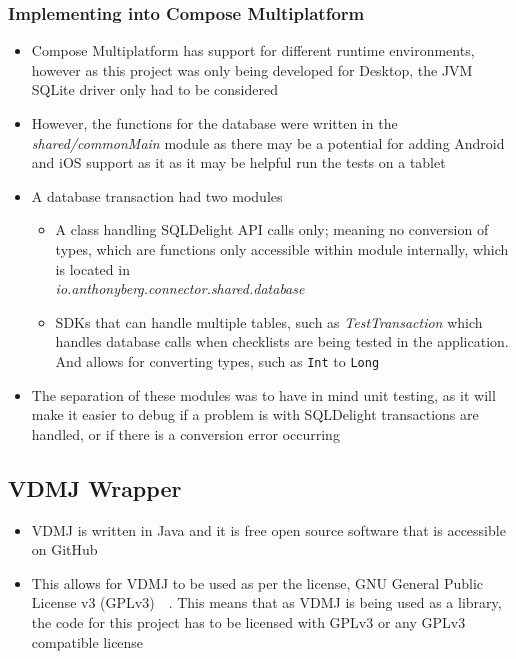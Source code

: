 \documentclass[../dissertation.tex]{subfiles}
\begin{document}
\subsubsection{Implementing into Compose Multiplatform}
\begin{itemize}
  \item Compose Multiplatform has support for different runtime environments,
    however as this project was only being developed for Desktop, the JVM
    SQLite driver only had to be considered
  \item However, the functions for the database were written in the \textit{shared/commonMain}
    module as there may be a potential for adding Android and iOS support as it
    as it may be helpful run the tests on a tablet
  \item A database transaction had two modules
    \begin{itemize}
      \item A class handling SQLDelight API calls only; meaning no conversion of types, which are
        functions only accessible within module internally, which is located in\\
        \textit{io.anthonyberg.connector.shared.database}
      \item SDKs that can handle multiple tables, such as \textit{TestTransaction} which handles database calls
        when checklists are being tested in the application.
        And allows for converting types, such as \lstinline|Int| to \lstinline|Long|
    \end{itemize}
  \item The separation of these modules was to have in mind unit testing, as
    it will make it easier to debug if a problem is with SQLDelight transactions
    are handled, or if there is a conversion error occurring
\end{itemize}

\subsection{VDMJ Wrapper}
\begin{itemize}
  \item VDMJ is written in Java and it is free open source software that is accessible on
    GitHub
  \item This allows for VDMJ to be used as per the license, GNU General Public License v3
    (GPLv3)~\cite{vdmj:license}~\cite{gpl3}. This means that as VDMJ is being used as a
    library, the code for this project has to be licensed with GPLv3 or any GPLv3 compatible
    license~\cite{gpl3:library}
\end{itemize}
\end{document}
